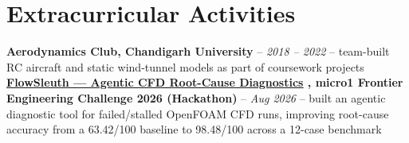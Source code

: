 \documentclass[a4paper,8pt]{article}
\newcommand{\ulhref}[2]{%
  {\hypersetup{urlcolor=.}\textcolor{.}{\href{#1}{\uline{#2}}}}%
}
\begin{document}
\section{Extracurricular Activities}
\color[HTML]{371e77}\textbf{Aerodynamics Club, Chandigarh University} \color[HTML]{000000}-- \textit{2018 -- 2022} -- team-built RC aircraft and static wind-tunnel models as part of coursework projects
\normalcolor\\
\color[HTML]{371e77}\textbf{\ulhref{https://github.com/Sanjanakamboj/flowsleuth}{FlowSleuth — Agentic CFD Root-Cause Diagnostics}, micro1 Frontier Engineering Challenge 2026 (Hackathon)} \color[HTML]{000000}-- \textit{Aug 2026} -- built an agentic diagnostic tool for failed/stalled OpenFOAM CFD runs, improving root-cause accuracy from a 63.42/100 baseline to 98.48/100 across a 12-case benchmark
\normalcolor
\end{document}
